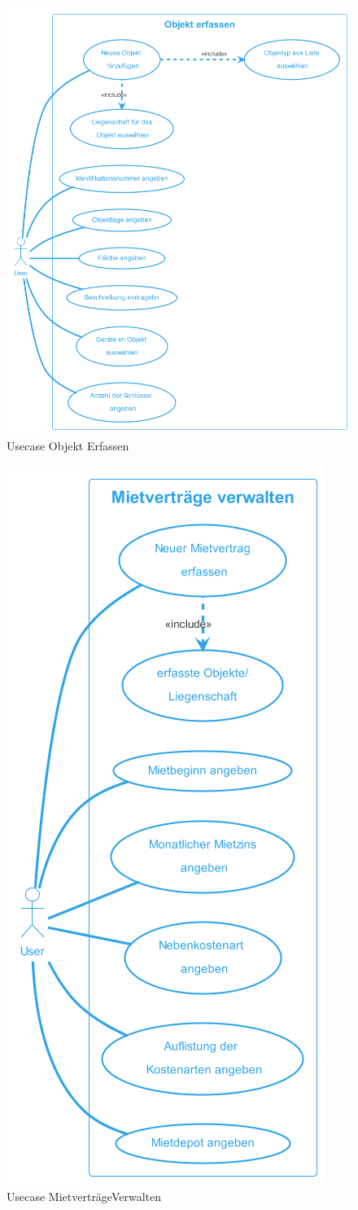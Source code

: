 \begin{figure}[H]
  \begin{center}
    \includegraphics[width=0.7\linewidth]{content/diagrams/out/usecase/objektErfassen/ObjektErfassen.png}
    \caption{Usecase Objekt Erfassen}
  \end{center}
  \label{objekt}
\end{figure}

\begin{figure}[H]
  \begin{center}
    \includegraphics[width=0.45\linewidth]{content/diagrams/out/usecase/mietverträgeVerwalten/MietverträgeVerwalten.png}
    \caption{Usecase MietverträgeVerwalten}
  \end{center}
  \label{MietvertraegeVerwalten}
\end{figure}

